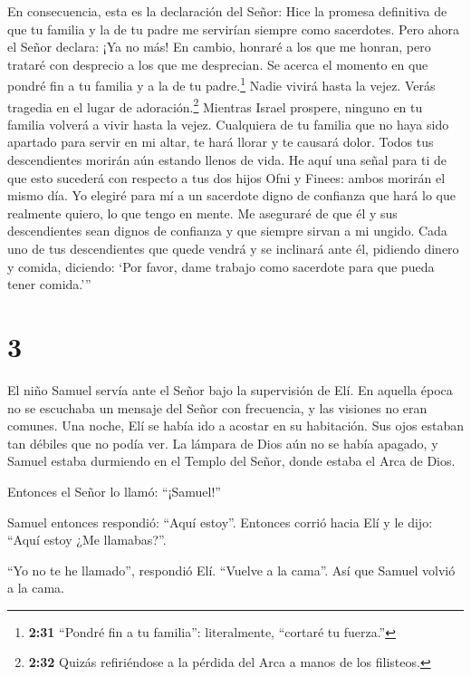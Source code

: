  En consecuencia, esta es la declaración del Señor: Hice la
promesa definitiva de que tu familia y la de tu padre me servirían
siempre como sacerdotes. Pero ahora el Señor declara: ¡Ya no más! En
cambio, honraré a los que me honran, pero trataré con desprecio a los
que me desprecian.  Se acerca el momento en que pondré fin
a tu familia y a la de tu padre.\footnote{\textbf{2:31} ``Pondré fin a
  tu familia'': literalmente, ``cortaré tu fuerza.''} Nadie vivirá hasta
la vejez.  Verás tragedia en el lugar de
adoración.\footnote{\textbf{2:32} Quizás refiriéndose a la pérdida del
  Arca a manos de los filisteos.} Mientras Israel prospere, ninguno en
tu familia volverá a vivir hasta la vejez.  Cualquiera de
tu familia que no haya sido apartado para servir en mi altar, te hará
llorar y te causará dolor. Todos tus descendientes morirán aún estando
llenos de vida.  He aquí una señal para ti de que esto
sucederá con respecto a tus dos hijos Ofni y Finees: ambos morirán el
mismo día.  Yo elegiré para mí a un sacerdote digno de
confianza que hará lo que realmente quiero, lo que tengo en mente. Me
aseguraré de que él y sus descendientes sean dignos de confianza y que
siempre sirvan a mi ungido.  Cada uno de tus descendientes
que quede vendrá y se inclinará ante él, pidiendo dinero y comida,
diciendo: `Por favor, dame trabajo como sacerdote para que pueda tener
comida.'''

\hypertarget{section-2}{%
\section{3}\label{section-2}}

 El niño Samuel servía ante el Señor bajo la supervisión de
Elí. En aquella época no se escuchaba un mensaje del Señor con
frecuencia, y las visiones no eran comunes.  Una noche, Elí
se había ido a acostar en su habitación. Sus ojos estaban tan débiles
que no podía ver.  La lámpara de Dios aún no se había
apagado, y Samuel estaba durmiendo en el Templo del Señor, donde estaba
el Arca de Dios.

 Entonces el Señor lo llamó: ``¡Samuel!''

Samuel entonces respondió: ``Aquí estoy''.  Entonces corrió
hacia Elí y le dijo: ``Aquí estoy ¿Me llamabas?''.

``Yo no te he llamado'', respondió Elí. ``Vuelve a la cama''. Así que
Samuel volvió a la cama.

